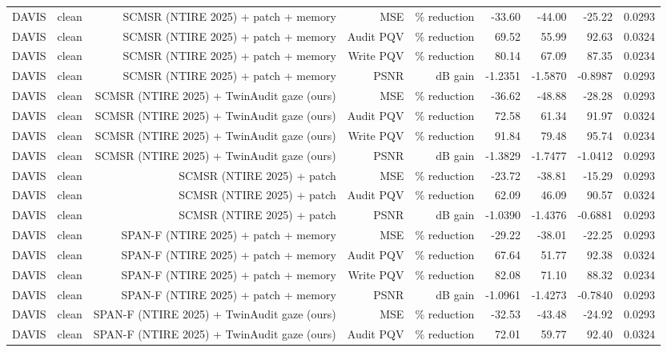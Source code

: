 \begin{table}[t]
\begin{tabular}{llrrrrrrr}
DAVIS & clean & SCMSR (NTIRE 2025) + patch + memory & MSE & \% reduction & -33.60 & -44.00 & -25.22 & 0.0293 \\
DAVIS & clean & SCMSR (NTIRE 2025) + patch + memory & Audit PQV & \% reduction & 69.52 & 55.99 & 92.63 & 0.0324 \\
DAVIS & clean & SCMSR (NTIRE 2025) + patch + memory & Write PQV & \% reduction & 80.14 & 67.09 & 87.35 & 0.0234 \\
DAVIS & clean & SCMSR (NTIRE 2025) + patch + memory & PSNR & dB gain & -1.2351 & -1.5870 & -0.8987 & 0.0293 \\
DAVIS & clean & SCMSR (NTIRE 2025) + TwinAudit gaze (ours) & MSE & \% reduction & -36.62 & -48.88 & -28.28 & 0.0293 \\
DAVIS & clean & SCMSR (NTIRE 2025) + TwinAudit gaze (ours) & Audit PQV & \% reduction & 72.58 & 61.34 & 91.97 & 0.0324 \\
DAVIS & clean & SCMSR (NTIRE 2025) + TwinAudit gaze (ours) & Write PQV & \% reduction & 91.84 & 79.48 & 95.74 & 0.0234 \\
DAVIS & clean & SCMSR (NTIRE 2025) + TwinAudit gaze (ours) & PSNR & dB gain & -1.3829 & -1.7477 & -1.0412 & 0.0293 \\
DAVIS & clean & SCMSR (NTIRE 2025) + patch & MSE & \% reduction & -23.72 & -38.81 & -15.29 & 0.0293 \\
DAVIS & clean & SCMSR (NTIRE 2025) + patch & Audit PQV & \% reduction & 62.09 & 46.09 & 90.57 & 0.0324 \\
DAVIS & clean & SCMSR (NTIRE 2025) + patch & PSNR & dB gain & -1.0390 & -1.4376 & -0.6881 & 0.0293 \\
DAVIS & clean & SPAN-F (NTIRE 2025) + patch + memory & MSE & \% reduction & -29.22 & -38.01 & -22.25 & 0.0293 \\
DAVIS & clean & SPAN-F (NTIRE 2025) + patch + memory & Audit PQV & \% reduction & 67.64 & 51.77 & 92.38 & 0.0324 \\
DAVIS & clean & SPAN-F (NTIRE 2025) + patch + memory & Write PQV & \% reduction & 82.08 & 71.10 & 88.32 & 0.0234 \\
DAVIS & clean & SPAN-F (NTIRE 2025) + patch + memory & PSNR & dB gain & -1.0961 & -1.4273 & -0.7840 & 0.0293 \\
DAVIS & clean & SPAN-F (NTIRE 2025) + TwinAudit gaze (ours) & MSE & \% reduction & -32.53 & -43.48 & -24.92 & 0.0293 \\
DAVIS & clean & SPAN-F (NTIRE 2025) + TwinAudit gaze (ours) & Audit PQV & \% reduction & 72.01 & 59.77 & 92.40 & 0.0324 \\

\end{tabular}
\end{table}

